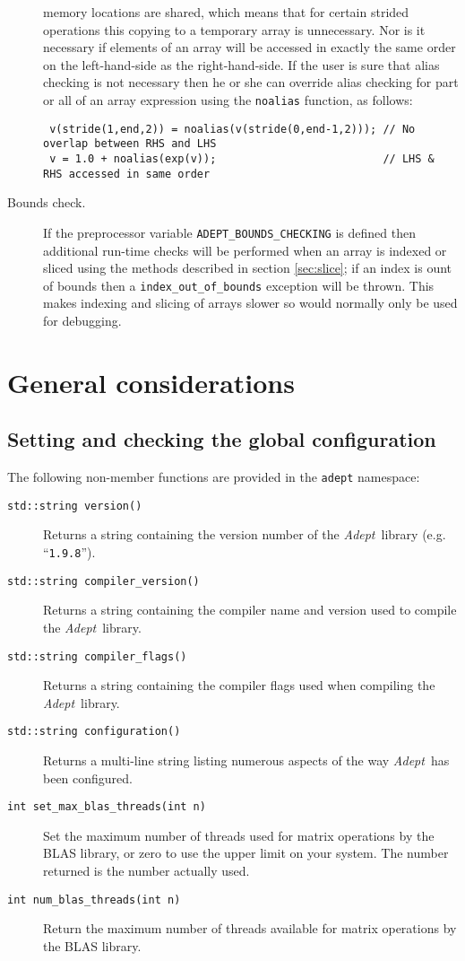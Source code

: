 \documentclass[a4,oneside]{book}
\def\codesize{\small}
\def\Adept{\emph{Adept}}
\def\code#1{{\codesize\texttt{#1}}}
\def\citem#1{\item[{\codesize\texttt{#1}}]}
\begin{document}
\begin{description}
  memory locations are shared, which means that for certain strided
  operations this copying to a temporary array is unnecessary.  Nor is
  it necessary if elements of an array will be accessed in exactly the
  same order on the left-hand-side as the right-hand-side. If the user
  is sure that alias checking is not necessary then he or she can
  override alias checking for part or all of an array expression using
  the \code{noalias} function, as follows:
\begin{lstlisting}
 v(stride(1,end,2)) = noalias(v(stride(0,end-1,2))); // No overlap between RHS and LHS
 v = 1.0 + noalias(exp(v));                          // LHS & RHS accessed in same order 
\end{lstlisting}
\item[Bounds check.] If the preprocessor variable
  \code{ADEPT\_BOUNDS\_CHECKING} is defined then additional run-time
  checks will be performed when an array is indexed or sliced using
  the methods described in section \ref{sec:slice}; if an index is
  ount of bounds then a \code{index\_out\_of\_bounds} exception will
  be thrown.  This makes indexing and slicing of arrays slower so
  would normally only be used for debugging.
\end{description}

\chapter{General considerations}
\label{chap:gen}

\section{Setting and checking the global configuration}
\label{sec:settings}
\noindent The following non-member functions are provided in the
\code{adept} namespace:
\begin{description}
\citem{std::string version()} Returns a string containing the version
number of the \Adept\ library (e.g. ``\code{1.9.8}'').
\citem{std::string compiler\_version()} Returns a string containing
the compiler name and version used to compile the \Adept\ library.
\citem{std::string compiler\_flags()} Returns a string containing the
compiler flags used when compiling the \Adept\ library.
\citem{std::string configuration()} Returns a multi-line string
listing numerous aspects of the way \Adept\ has been configured.
\citem{int set\_max\_blas\_threads(int n)} Set the maximum number of
threads used for matrix operations by the BLAS library, or zero to use
the upper limit on your system. The number returned is the number
actually used.  
\citem{int num\_blas\_threads(int n)} Return the maximum number of
threads available for matrix operations by the BLAS library.
%
\end{description}
\end{document}
